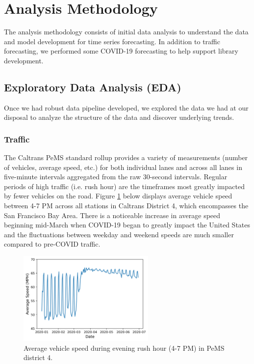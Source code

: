 \documentclass{article}
\begin{document}
\section{Analysis Methodology}

The analysis methodology consists of initial data analysis to understand the data and model development for time series forecasting. In addition to traffic forecasting, we performed some COVID-19 forecasting to help support library development.

\subsection{Exploratory Data Analysis (EDA)}

Once we had robust data pipeline developed, we explored the data we had at our disposal to analyze the structure of the data and discover underlying trends.

\subsubsection{Traffic}

The Caltrans PeMS standard rollup provides a variety of measurements (number of vehicles, average speed, etc.) for both individual lanes and across all lanes in five-minute intervals aggregated from the raw 30-second intervals. Regular periods of high traffic (i.e. rush hour) are the timeframes most greatly impacted by fewer vehicles on the road. Figure \ref{fig:traffic-eda-day} below displays average vehicle speed between 4-7 PM across all stations in Caltrans District 4, which encompasses the San Francisco Bay Area. There is a noticeable increase in average speed beginning mid-March when COVID-19 began to greatly impact the United States and the fluctuations between weekday and weekend speeds are much smaller compared to pre-COVID traffic.

\begin{figure}[hbt!]
	\centering
	\includegraphics[width=0.6\textwidth]{images/traffic_speed_day.png}
	\caption{Average vehicle speed during evening rush hour (4-7 PM) in PeMS district 4.}
	\label{fig:traffic-eda-day}
\end{figure}
\end{document}
